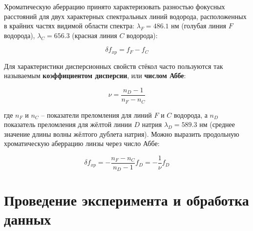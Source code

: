 	Хроматическую аберрацию принято характеризовать разностью фокусных расстояний для двух характерных спектральных линий водорода, расположенных в крайних частях видимой области спектра: $\lambda_F = 486.1$ нм (голубая линия $F$ водорода), $\lambda_C = 656.3$ (красная линия $C$ водорода):
	
	\begin{equation} \label{eq:chromatic_aberation}
		\delta f_{xp} = f_F - f_C
	\end{equation}

	Для характеристики дисперсионных свойств стёкол часто пользуются так называемым \textbf{коэффициентом дисперсии}, или \textbf{числом Аббе}:
	
	\begin{equation} \label{eq:Abbe_constant}
		\nu = \frac{n_D - 1}{n_F - n_C}
	\end{equation}
	
	где $n_F$ и $n_C$ -- показатели преломления для линий $F$ и $C$ водорода, а $n_D$ показатель преломления для жёлтой линии $D$ натрия $\lambda_D = 589.3$ нм (среднее значение длины волны жёлтого дублета натрия). Можно выразить продольную хроматическую аберрацию линзы через число Аббе:
	
	\begin{equation}
		\delta f_{xp} = - \frac{n_F - n_C}{n_D - 1} f_D = - \frac{1}{\nu} f_D
	\end{equation}
	
	\newpage
	
	\section*{Проведение эксперимента и обработка данных}
	
